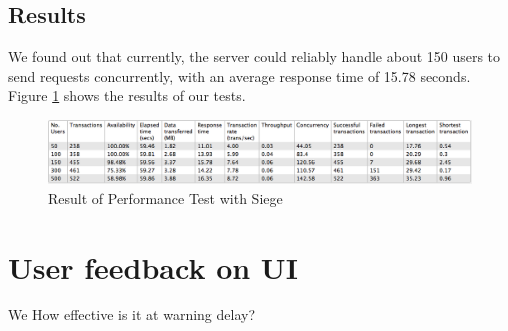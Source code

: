 \subsection{Results}
\par We found out that currently, the server could reliably handle about 150 users to send requests concurrently, with an average response time of 15.78 seconds. Figure \ref{fig:performance} shows the results of our tests.

\begin{figure}
\centering
\includegraphics[width=\textwidth]{figures/performance.png}
\caption{\label{fig:performance} Result of Performance Test with Siege}
\end{figure}


\section{User feedback on UI}
We
How effective is it at warning delay?

